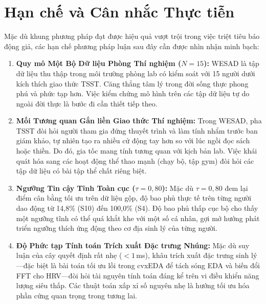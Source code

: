 \documentclass[conference]{IEEEtran}
\begin{document}
\section{Hạn chế và Cân nhắc Thực tiễn}
Mặc dù khung phương pháp đạt được hiệu quả vượt trội trong việc triệt tiêu báo động giả, các hạn chế phương pháp luận sau đây cần được nhìn nhận minh bạch:
\begin{enumerate}
    \item \textbf{Quy mô Một Bộ Dữ liệu Phòng Thí nghiệm ($N=15$):} WESAD là tập dữ liệu thu thập trong môi trường phòng lab có kiểm soát với 15 người dưới kích thích giao thức TSST. Căng thẳng tâm lý trong đời sống thực phong phú và phức tạp hơn. Việc kiểm chứng mô hình trên các tập dữ liệu tự do ngoài đời thực là bước đi cần thiết tiếp theo.
    \item \textbf{Mối Tương quan Gắn liền Giao thức Thí nghiệm:} Trong WESAD, pha TSST đòi hỏi người tham gia đứng thuyết trình và làm tính nhẩm trước ban giám khảo, tự nhiên tạo ra nhiều cử động tay hơn so với lúc ngồi đọc sách hoặc thiền. Do đó, gia tốc mang tính tương quan với kịch bản lab. Việc khái quát hóa sang các hoạt động thể thao mạnh (chạy bộ, tập gym) đòi hỏi các tập dữ liệu có bài tập thể chất riêng biệt.
    \item \textbf{Ngưỡng Tin cậy Tĩnh Toàn cục ($\tau = 0,80$):} Mặc dù $\tau = 0,80$ đem lại điểm cân bằng tối ưu trên dữ liệu gộp, độ bao phủ thực tế trên từng người dao động từ 14,8\% (S10) đến 100,0\% (S4). Độ bao phủ thấp cục bộ cho thấy một ngưỡng tĩnh có thể quá khắt khe với một số cá nhân, gợi mở hướng phát triển ngưỡng thích ứng động theo cơ địa sinh lý của từng người.
    \item \textbf{Độ Phức tạp Tính toán Trích xuất Đặc trưng Nhúng:} Mặc dù suy luận của cây quyết định rất nhẹ ($< 1$\,ms), khâu trích xuất đặc trưng sinh lý—đặc biệt là bài toán tối ưu lồi trong cvxEDA để tách sóng EDA và biến đổi FFT cho HRV—đòi hỏi tài nguyên tính toán đáng kể trên vi điều khiển năng lượng siêu thấp. Các thuật toán xấp xỉ số nguyên nhẹ là hướng tối ưu hóa phần cứng quan trọng trong tương lai.
\end{enumerate}

\end{document}
